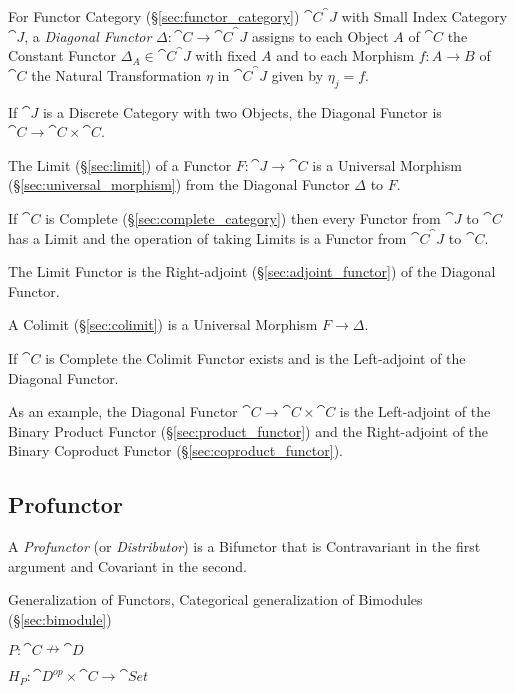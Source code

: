 For Functor Category (\S\ref{sec:functor_category})
$\cat{C}^\cat{J}$ with Small Index Category $\cat{J}$, a
\emph{Diagonal Functor} $\Delta : \cat{C} \rightarrow
\cat{C}^\cat{J}$ assigns to each Object $A$ of $\cat{C}$ the
Constant Functor $\Delta_A \in \cat{C}^\cat{J}$ with fixed $A$
and to each Morphism $f : A \rightarrow B$ of $\cat{C}$ the Natural
Transformation $\eta$ in $\cat{C}^\cat{J}$ given by $\eta_j =
f$.

If $\cat{J}$ is a Discrete Category with two Objects, the Diagonal
Functor is $\cat{C} \rightarrow \cat{C} \times \cat{C}$.

The Limit (\S\ref{sec:limit}) of a Functor $F : \cat{J} \rightarrow
\cat{C}$ is a Universal Morphism (\S\ref{sec:universal_morphism})
from the Diagonal Functor $\Delta$ to $F$.

If $\cat{C}$ is Complete (\S\ref{sec:complete_category}) then every
Functor from $\cat{J}$ to $\cat{C}$ has a Limit and the
operation of taking Limits is a Functor from $\cat{C}^\cat{J}$
to $\cat{C}$.

The Limit Functor is the Right-adjoint (\S\ref{sec:adjoint_functor})
of the Diagonal Functor.

A Colimit (\S\ref{sec:colimit}) is a Universal Morphism $F \rightarrow
\Delta$.

If $\cat{C}$ is Complete the Colimit Functor exists and is the
Left-adjoint of the Diagonal Functor.

As an example, the Diagonal Functor $\cat{C} \rightarrow \cat{C}
\times \cat{C}$ is the Left-adjoint of the Binary Product Functor
(\S\ref{sec:product_functor}) and the Right-adjoint of the Binary
Coproduct Functor (\S\ref{sec:coproduct_functor}).



\subsection{Profunctor}\label{sec:profunctor}

A \emph{Profunctor} (or \emph{Distributor}) is a Bifunctor that is
Contravariant in the first argument and Covariant in the second.

Generalization of Functors, Categorical generalization of Bimodules
(\S\ref{sec:bimodule})

$P : \cat{C} \nrightarrow \cat{D}$

$H_P : \cat{D}^{op} \times \cat{C} \rightarrow \cat{Set}$

